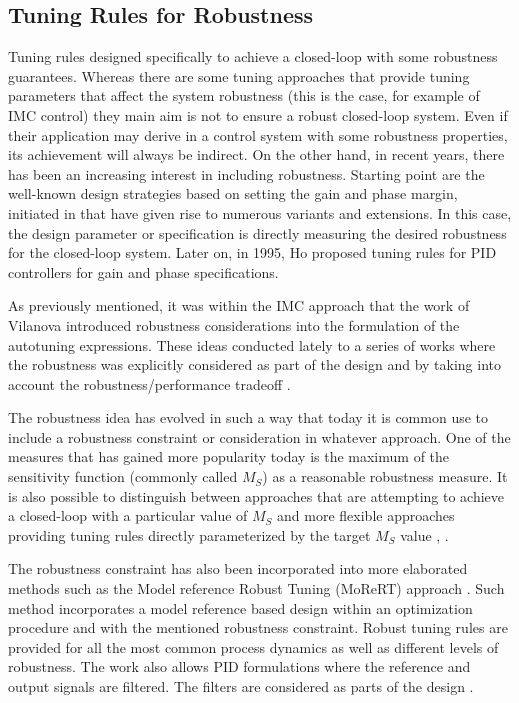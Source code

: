 \subsection{Tuning Rules for Robustness}

Tuning rules designed specifically to achieve a closed-loop with some robustness guarantees. Whereas there are some tuning approaches that provide tuning parameters that  affect the system robustness (this is the case, for example of IMC control) they main aim is not to ensure a robust closed-loop system. Even if their application may derive in a control system with some robustness properties, its achievement will always be indirect. On the other hand, in recent years, there has been an increasing interest in including robustness. Starting point are the well-known design strategies based on setting the gain and phase margin, initiated in \cite{astromhagglun84} that have given rise to numerous variants and extensions. In this case, the design parameter or specification is directly measuring the desired robustness for the closed-loop system. Later on, in 1995, Ho \cite{hoetal95} proposed tuning rules for PID controllers for gain and phase specifications.

As previously mentioned, it was within the IMC approach that the work of Vilanova \cite{vilanovaJPC2008} introduced robustness considerations into the formulation of the autotuning  expressions. These ideas conducted lately to a series of works \cite{alcantara2010, alcantara2013} where the robustness was explicitly considered as part of the design and by taking into account the robustness/performance tradeoff \cite{alfaroajoc12}.

The robustness idea has evolved in such a way that today it is common use to include a robustness constraint or consideration in whatever approach. One of the measures that has gained more popularity today is the maximum of the sensitivity function (commonly called $M_S$) as a reasonable robustness measure. It is also possible to distinguish between approaches that are attempting to achieve a closed-loop with a particular value of $M_S$ and more flexible approaches providing tuning rules directly parameterized by the target $M_S$ value \cite{arrieta2012}, \cite{VilanovaBook2012}. 

The robustness constraint has also been incorporated into more elaborated  methods such as the Model reference Robust Tuning (MoReRT) approach \cite{alfarojopc22}. Such method incorporates a model reference based design within an optimization procedure and with the mentioned robustness constraint. Robust tuning rules are provided for all the most common process dynamics as well as different levels of robustness. The work also allows PID formulations where the reference and output signals are filtered. The filters are considered as parts of the design \cite{alfaroiechr2013}.




